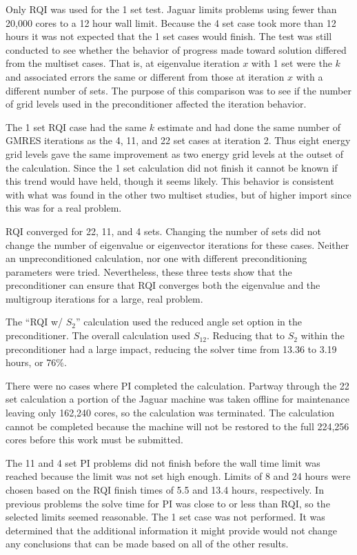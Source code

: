 Only RQI was used for the 1 set test. Jaguar limits problems using fewer than 20,000 cores to a 12 hour wall limit. Because the 4 set case took more than 12 hours it was not expected that the 1 set cases would finish. The test was still conducted to see whether the behavior of progress made toward solution differed from the multiset cases. That is, at eigenvalue iteration $x$ with 1 set were the $k$ and associated errors the same or different from those at iteration $x$ with a different number of sets. The purpose of this comparison was to see if the number of grid levels used in the preconditioner affected the iteration behavior. 

The 1 set RQI case had the same $k$ estimate and had done the same number of GMRES iterations as the 4, 11, and 22 set cases at iteration 2. Thus eight energy grid levels gave the same improvement as two energy grid levels at the outset of the calculation. Since the 1 set calculation did not finish it cannot be known if this trend would have held, though it seems likely. This behavior is consistent with what was found in the other two multiset studies, but of higher import since this was for a real problem.

RQI converged for 22, 11, and 4 sets. Changing the number of sets did not change the number of eigenvalue or eigenvector iterations for these cases. Neither an unpreconditioned calculation, nor one with different preconditioning parameters were tried. Nevertheless, these three tests show that the preconditioner can ensure that RQI converges both the eigenvalue and the multigroup iterations for a large, real problem. 

The ``RQI w/ $S_{2}$'' calculation used the reduced angle set option in the preconditioner. The overall calculation used $S_{12}$. Reducing that to $S_{2}$ within the preconditioner had a large impact, reducing the solver time from 13.36 to 3.19 hours, or 76\%. 

There were no cases where PI completed the calculation. Partway through the 22 set calculation a portion of the Jaguar machine was taken offline for maintenance leaving only 162,240 cores, so the calculation was terminated. The calculation cannot be completed because the machine will not be restored to the full 224,256 cores before this work must be submitted. 

The 11 and 4 set PI problems did not finish before the wall time limit was reached because the limit was not set high enough. Limits of 8 and 24 hours were chosen based on the RQI finish times of 5.5 and 13.4 hours, respectively. In previous problems the solve time for PI was close to or less than RQI, so the selected limits seemed reasonable. The 1 set case was not performed. It was determined that the additional information it might provide would not change any conclusions that can be made based on all of the other results. 

